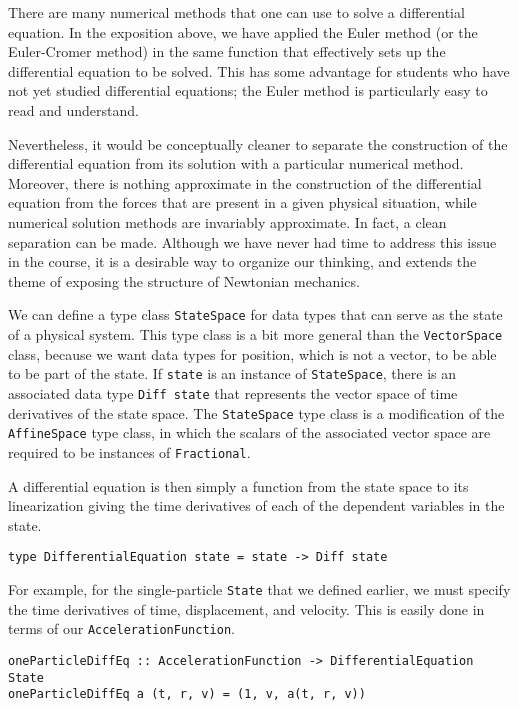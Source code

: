 \documentclass{eptcs}
\begin{document}
There are many numerical methods that one can use to solve a differential
equation.  In the exposition above, we have applied the Euler method
(or the Euler-Cromer method) in the same function that effectively sets
up the differential equation to be solved.  This has some advantage
for students who have not yet studied differential equations; the Euler
method is particularly easy to read and understand.

Nevertheless, it would be conceptually cleaner to separate the construction of the differential
equation from its solution with a particular numerical method.
Moreover, there is nothing approximate in the construction of the differential
equation from the forces that are present in a given physical situation,
while numerical solution methods are invariably approximate.
In fact, a clean separation can be made.  Although
we have never had time to address this issue in the course,
it is a desirable way to organize our thinking, and extends the
theme of exposing the structure of Newtonian mechanics.

We can define a type class \verb|StateSpace|
for data types that can serve as the state of a physical system.
This type class is a bit more general than the \verb|VectorSpace| class,
because we want data types for position, which is not a vector,
to be able to be part of the state.
If \verb|state| is an instance of \verb|StateSpace|,
there is an associated data type \verb|Diff state| that represents
the vector space of time derivatives of the state space.
The \verb|StateSpace| type class is a modification of the
\verb|AffineSpace| type class\cite{vector-space}, in which the
scalars of the associated vector space are required to be instances
of \verb|Fractional|.

A differential equation is then simply a function from the state space to
its linearization giving the time derivatives of each of the dependent
variables in the state.
\begin{verbatim}
type DifferentialEquation state = state -> Diff state
\end{verbatim}
For example, for the single-particle \verb|State| that we defined earlier,
we must specify the time derivatives of time, displacement, and velocity.
This is easily done in terms of our \verb|AccelerationFunction|.
\begin{verbatim}
oneParticleDiffEq :: AccelerationFunction -> DifferentialEquation State
oneParticleDiffEq a (t, r, v) = (1, v, a(t, r, v))
\end{verbatim}
\end{document}
